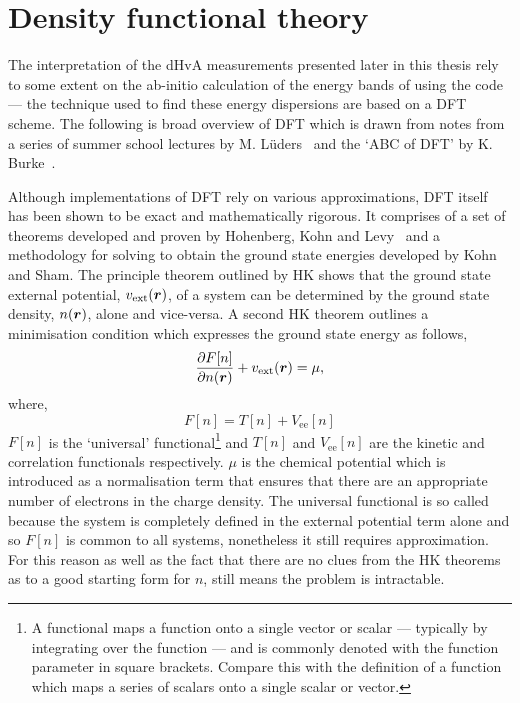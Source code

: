 
\section{Density functional theory}
\label{Sec:Theo:Dft}

The interpretation of the \ac{dHvA} measurements presented later in this thesis rely to some extent on the ab-initio calculation of the energy bands of \BaFeP{} using the \WIEN{} code~\cite{Blaha2001} --- the technique used to find these energy dispersions are based on a \ac{DFT} scheme. The following is broad overview of \ac{DFT} which is drawn from notes from a series of summer school lectures by M. L\"uders~\cite{Luders2010} and the `ABC of DFT' by K. Burke~\cite{Burke2003}.

 Although implementations of \ac{DFT} rely on various approximations, \ac{DFT} itself has been shown to be exact and mathematically rigorous. It comprises of a set of theorems developed and proven by Hohenberg, Kohn and Levy~\cite{Hohenberg1964, Levy1979} and a methodology for solving to obtain the ground state energies developed by Kohn and Sham. The principle theorem outlined by \ac{HK} shows that the ground state external potential, $v_{\textrm{ext}}(\boldsymbol{r})$, of a system can be determined by the ground state density, $n(\boldsymbol{r})$, alone and vice-versa. A second \ac{HK} theorem outlines a minimisation condition which expresses the ground state energy as follows,
\begin{equation}
\label{Eqn:Theo:HKMinimisation}
\frac{\partial F[n]}{\partial n(\boldsymbol{r})} + v_{\textrm{ext}}(\boldsymbol{r}) = \mu,
\end{equation}
where,
\begin{equation}
F[n] = T[n] + V_{\textrm{ee}}[n]
\end{equation}
$F[n]$ is the `universal' functional\footnote{A functional maps a function onto a single vector or scalar --- typically by integrating over the function --- and is commonly denoted with the function parameter in square brackets. Compare this with the definition of a function which maps a series of scalars onto a single scalar or vector.} and $T[n]$ and $V_{\textrm{ee}}[n]$ are the kinetic and correlation functionals respectively. $\mu$ is the chemical potential which is introduced as a normalisation term that ensures that there are an appropriate number of electrons in the charge density. The universal functional is so called because the system is completely defined in the external potential term alone and so $F[n]$ is common to all systems, nonetheless it still requires approximation. For this reason as well as the fact that there are no clues from the \ac{HK} theorems as to a good starting form for $n$, still means the problem is intractable.

